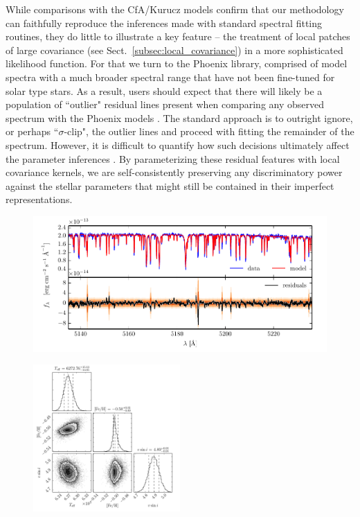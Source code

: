 \documentclass[iop,floatfix]{emulateapj}
\begin{document}
While comparisons with the {\sc CfA/Kurucz} models confirm that our methodology can faithfully 
reproduce the inferences made with standard spectral fitting routines, they do little to illustrate 
a key feature -- the treatment of local patches of large covariance (see 
Sect.~\ref{subsec:local_covariance}) in a more sophisticated likelihood function.  For that we turn 
to the {\sc Phoenix} library, comprised of model spectra with a much broader spectral range that 
have not been fine-tuned for solar type stars.  As a result, users should expect that there will 
likely be a population of ``outlier" residual lines present when comparing any observed spectrum 
with the {\sc Phoenix} models \citep[e.g.,][their Fig.~8]{husser13}.  The standard approach is to 
outright ignore, or perhaps ``$\sigma$-clip", the outlier lines and proceed with fitting the 
remainder of the spectrum.  However, it is difficult to quantify how such decisions ultimately 
affect the parameter inferences \citep{hogg10}.  By parameterizing these residual features with 
local covariance kernels, we are self-consistently preserving any discriminatory power against the 
stellar parameters that might still be contained in their imperfect representations.  

\begin{figure}[!htb]
\includegraphics{figs/residuals_PHOENIX_logg.pdf}
\end{figure}

\begin{figure}[!b]
\begin{center}
  \includegraphics[width=0.5\textwidth]{figs/PHOENIX_triangle.pdf}
\end{center}
\end{figure}
\end{document}

